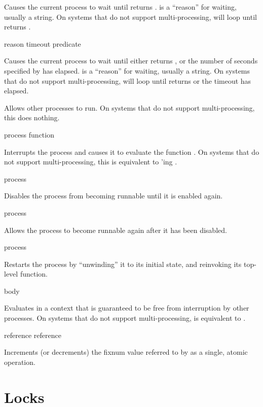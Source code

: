 Causes the current process to wait until  returns .
 is a ``reason'' for waiting, usually a string.  On systems that do
not support multi-processing,  will loop until 
returns .

 {reason timeout predicate}

Causes the current process to wait until either  returns
, or the number of seconds specified by  has elapsed.
 is a ``reason'' for waiting, usually a string.  On systems that do
not support multi-processing,  will loop until
 returns  or the timeout has elapsed.

 {}

Allows other processes to run.  On systems that do not support multi-processing,
this does nothing.

 {process function}

Interrupts the process  and causes it to evaluate the function
.  On systems that do not support multi-processing, this is
equivalent to 'ing .

 {process}

Disables the process  from becoming runnable until it is enabled
again.

 {process}

Allows the process  to become runnable again after it has been
disabled.

 {process}

Restarts the process  by ``unwinding'' it to its initial state, and
reinvoking its top-level function.

 {\body body}

Evaluates  in a context that is guaranteed to be free from
interruption by other processes.  On systems that do not support
multi-processing,  is equivalent to .

 {reference}
 {reference}

Increments (or decrements) the fixnum value referred to by  as a
single, atomic operation.


\section {Locks}

